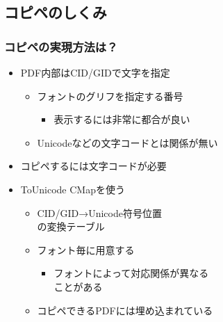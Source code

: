 \subsection{コピペのしくみ}
\begin{frame}\frametitle{コピペの実現方法は？}
  \begin{itemize}
  \item PDF内部はCID/GIDで文字を指定
    \begin{itemize}
    \item フォントのグリフを指定する番号
      \begin{itemize}
      \item 表示するには非常に都合が良い
      \end{itemize}
    \item Unicodeなどの文字コードとは関係が無い
    \end{itemize}
  \item コピペするには文字コードが必要

    \pause
    \vspace{1\zh}

  \item ToUnicode CMapを使う
    \begin{itemize}
    \item CID/GID→Unicode符号位置 \\ の変換テーブル
    \item フォント毎に用意する
      \begin{itemize}
      \item フォントによって対応関係が異なる \\ ことがある
      \end{itemize}
    \item コピペできるPDFには埋め込まれている
    \end{itemize}
  \end{itemize}
\end{frame}

